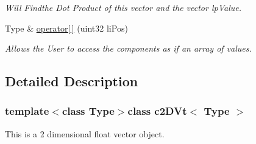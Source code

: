 \begin{DoxyCompactItemize}
\begin{DoxyCompactList}\small\item\em Will Findthe Dot Product of this vector and the vector lpValue. \end{DoxyCompactList}\item 
\hypertarget{classc2_d_vt_ab3e4018fe61213fb89d5a3715dc305c9}{
Type \& \hyperlink{classc2_d_vt_ab3e4018fe61213fb89d5a3715dc305c9}{operator\mbox{[}$\,$\mbox{]}} (uint32 liPos)}
\label{classc2_d_vt_ab3e4018fe61213fb89d5a3715dc305c9}

\begin{DoxyCompactList}\small\item\em Allows the User to access the components as if an array of values. \end{DoxyCompactList}\end{DoxyCompactItemize}


\subsection{Detailed Description}
\subsubsection*{template$<$class Type$>$class c2DVt$<$ Type $>$}

This is a 2 dimensional float vector object. 